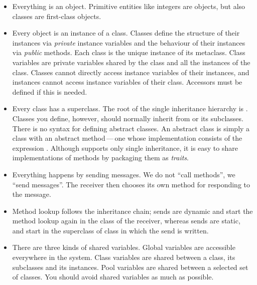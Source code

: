 \documentclass[a4paper,10pt,twoside]{book}
\begin{document}
\begin{itemize}
  \item Everything is an object.
  Primitive entities like integers are objects, but also classes are first-class objects.

  \item Every object is an instance of a class.
  Classes define the structure of their instances via \emph{private} instance variables and the behaviour of their instances via \emph{public} methods. Each class is the unique instance of its metaclass.  Class variables are private variables shared by the class and all the instances of the class.
  Classes cannot directly access instance variables of their instances, and instances cannot access instance variables of their class.
  Accessors must be defined if this is needed.

  \item Every class has a superclass.
  The root of the single inheritance hierarchy is .
  Classes you define, however, should normally inherit from  or its subclasses.
  There is no syntax for defining abstract classes.
  An abstract class is simply a class with an abstract method\,---\,one 
  whose implementation consists of the expression .
  Although \pharo supports only single inheritance, it is easy to share implementations of methods by packaging them as \emph{traits}.

  \item Everything happens by sending messages.
	We do not ``call methods'', we ``send messages''.
	The receiver then chooses its own method for responding to the message.

  \item Method lookup follows the inheritance chain;
  \self sends are dynamic and start the method lookup again in the class of the receiver, whereas
  \super sends are static, and start in the superclass of class in which the \super send is written.
  
  \item There are three kinds of shared variables.
  		Global variables are accessible everywhere in the system.
		Class variables are shared between a class, its subclasses and its instances.
		Pool variables are shared between a selected set of classes.
		You should avoid shared variables as much as possible.

\end{itemize}

\ifx\wholebook\relax\else
   
   
\end{document}
